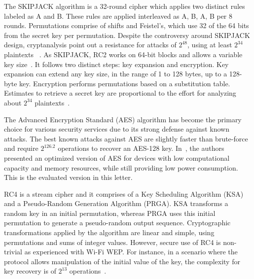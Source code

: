 \documentclass[journal]{IEEEtran}
\newcommand{\rever}[1]{{\color{blue}{[#1]}}}
\newcommand{\gn}[1]{{\color{red}{[#1]}}}
\begin{document}
The SKIPJACK algorithm is a 32-round cipher which applies two distinct rules labeled as A and B. These rules are applied interleaved as A, B, A, B per 8 rounds. Permutations comprise of shifts and Feistel's, which use 32 of the 64 bits from the secret key per permutation. Despite the controversy around SKIPJACK design, cryptanalysis point out a resistance for attacks of $2^{48}$, using at least $2^{34}$ plaintexts~\cite{biham1999cryptanalysis}%
. As SKIPJACK, RC2 works on 64-bit blocks and allows a variable key size~\cite{knudsen1998design}. It follows two distinct steps: key expansion and encryption. Key expansion can extend any key size, in the range of 1 to 128 bytes, up to a 128-byte key. Encryption performs permutations based on a substitution table. Estimates to retrieve a secret key are proportional to the effort for analyzing about $2^{34}$ plaintexts~\cite{biham1999cryptanalysis}.%


The Advanced Encryption Standard (AES) algorithm has become the primary choice for various security services %
due to its strong defense against known attacks. The best known attacks against AES are slightly faster than brute-force and require $2^{126.2}$ operations to recover an AES-128 key. In~\cite{nasser2016aes}, the authors presented an optimized version of AES for devices with low computational capacity and memory resources, while still providing low power consumption. This is the evaluated version in this letter. %

RC4 is a stream cipher and it comprises of a Key Scheduling Algorithm (KSA) and a Pseudo-Random Generation Algorithm (PRGA). KSA transforms a random key in an initial permutation, whereas PRGA uses this initial permutation to generate a pseudo-random output sequence. Cryptographic transformations applied by the algorithm are linear and simple, using permutations and sums of integer values. However, secure use of RC4 is non-trivial as experienced with Wi-Fi WEP. For instance, in a scenario where the protocol allows manipulation of the initial value of the key, the complexity for key recovery is of $2^{13}$ operations~\cite{orumiehchiha2013cryptanalysis}.
\vspace{-0.2cm}
\end{document}
